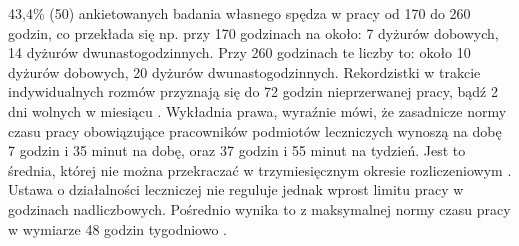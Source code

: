 \documentclass[a4paper,12pt,twoside,openright]{mwrep}
\begin{document}
 43,4\%  (50) ankietowanych badania własnego spędza w pracy od 170 do 260 godzin, co przekłada się np. przy 170 godzinach na około:  7 dyżurów dobowych, 14 dyżurów dwunastogodzinnych. Przy 260 godzinach te liczby to: około  10 dyżurów dobowych,  20 dyżurów dwunastogodzinnych. Rekordzistki w trakcie indywidualnych rozmów przyznają się do 72 godzin nieprzerwanej pracy, bądź 2 dni wolnych w miesiącu \cite{cyfrowe}.  Wykładnia prawa, wyraźnie mówi, że zasadnicze normy czasu pracy obowiązujące pracowników podmiotów leczniczych wynoszą na dobę 7 godzin i 35 minut na dobę, oraz 37 godzin i 55 minut na tydzień. Jest to średnia, której nie można przekraczać w trzymiesięcznym okresie rozliczeniowym \cite{okres}. Ustawa o działalności leczniczej nie reguluje  jednak wprost limitu pracy w godzinach nadliczbowych. Pośrednio wynika to z maksymalnej normy czasu pracy w wymiarze 48 godzin tygodniowo \cite{klauzula}.
 
\end{document}
